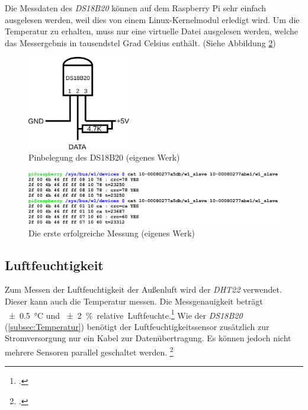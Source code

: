 Die Messdaten des \textit{DS18B20} können auf dem Raspberry Pi sehr einfach ausgelesen werden, weil dies von einem Linux-\gls{Kernelmodul} erledigt wird. Um die Temperatur zu erhalten, muss  nur eine virtuelle Datei ausgelesen werden, welche das Messergebnis in tausendstel Grad Celsius enthält. (Siehe Abbildung \ref{fig:temp_screenshot})
\begin{figure}
  \centering
     \includegraphics[width=0.4\textwidth]{figures/temp_pin.png}
  \caption{Pinbelegung des DS18B20 (eigenes Werk)}
  \label{fig:temp_pin}
\end{figure}
\begin{figure}[h]
  \centering
     \includegraphics[width=\textwidth]{figures/temp_screenshot.png}
  \caption{Die erste erfolgreiche Messung (eigenes Werk)}
  \label{fig:temp_screenshot}
\end{figure}

\subsection{Luftfeuchtigkeit}
\label{subsec:Luftfeuchtigkeit}

Zum Messen der Luftfeuchtigkeit der Außenluft wird der \textit{DHT22} verwendet. Dieser kann auch die Temperatur messen. Die Messgenauigkeit beträgt \SI{\pm 0.5}{\degreeCelsius} und \SI{\pm 2}{\% .relative.Luftfeuchte}.\footcite{DHT22}
Wie der \textit{DS18B20} (\ref{subsec:Temperatur}) benötigt der Luftfeuchtigkeitssensor zusätzlich zur Stromversorgung nur ein Kabel zur Datenübertragung. Es können jedoch nicht mehrere Sensoren parallel geschaltet werden. \footcite[Wiring]{DHT}

